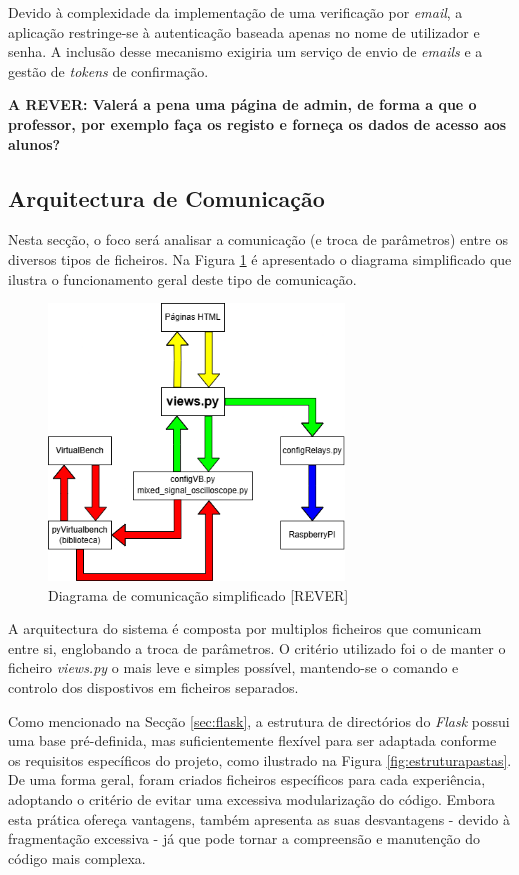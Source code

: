 Devido à complexidade da implementação de uma verificação por \textit{email}, a aplicação restringe-se à autenticação baseada apenas no nome de utilizador e senha. A inclusão desse mecanismo exigiria um serviço de envio de \textit{emails} e a gestão de \textit{tokens} de confirmação.

\textbf{A REVER: Valerá a pena uma página de admin, de forma a que o professor, por exemplo faça os registo e forneça os dados de acesso aos alunos?}

\subsection{Arquitectura de Comunicação}
\label{sec:comunicacao}
Nesta secção, o foco será analisar a comunicação (e troca de parâmetros) entre os diversos tipos de ficheiros. Na Figura \ref{fig:diagramasimplificado} é apresentado o diagrama simplificado que ilustra o funcionamento geral deste tipo de comunicação. 

\begin{figure}[hbtp]
	\centering
	\includegraphics[width=0.7\textwidth]{figures/Diagrama_simplificado.drawio.png}
	\caption{Diagrama de comunicação simplificado [REVER]}
	\label{fig:diagramasimplificado}
\end{figure}

A arquitectura do sistema é composta por multiplos ficheiros que comunicam entre si, englobando a troca de parâmetros. O critério utilizado foi o de manter o ficheiro \textit{views.py} o mais leve e simples possível, mantendo-se o comando e controlo dos dispostivos em ficheiros separados.

Como mencionado na Secção \ref{sec:flask}, a estrutura de directórios do \textit{Flask} possui uma base pré-definida, mas suficientemente flexível para ser adaptada conforme os requisitos específicos do projeto, como ilustrado na Figura \ref{fig:estruturapastas}. De uma forma geral, foram criados ficheiros específicos para cada experiência, adoptando o critério de evitar uma excessiva modularização do código. Embora esta prática ofereça vantagens, também apresenta as suas desvantagens - devido à fragmentação excessiva - já que pode tornar a compreensão e manutenção do código mais complexa.

